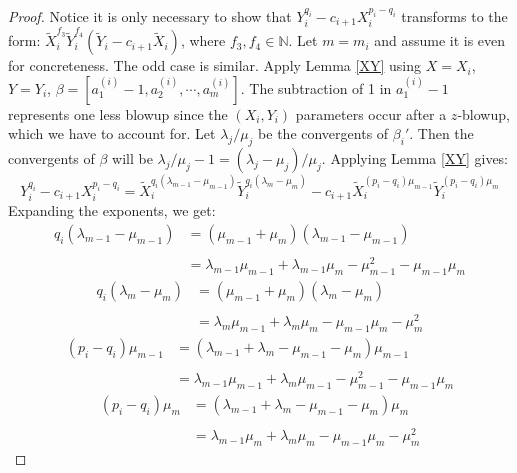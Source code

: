 \documentclass[11pt]{amsart}
\theoremstyle{definition}
\begin{document}
{\begin{proof}
Notice it is only necessary to show that $Y_{i}^{q_i} - c_{i+1}X_{i}^{p_i-q_i}$ transforms to the form: $\tilde X_{i}^{f_3} \tilde Y_{i}^{f_4} \left(\tilde Y_{i}-c_{i+1} \tilde X_{i}\right)$, where $f_3,f_4\in\mathbb{N}$. Let $m=m_i$ and assume it is even for concreteness. The odd case is similar. Apply Lemma \ref{XY} using $X=X_i$, $Y=Y_i$, $\beta=\left[a_1^{(i)}-1,a_2^{(i)},\cdots,a_{m}^{(i)}\right]$. The subtraction of 1 in $a_1^{(i)}-1$ represents one less blowup since the $(X_i,Y_i)$ parameters occur after a $z$-blowup, which we have to account for. Let $\lambda_j/\mu_j$ be the convergents of $\beta_i'$. Then the convergents of $\beta$ will be $\lambda_j/\mu_j-1=(\lambda_j-\mu_j)/\mu_j$. Applying Lemma \ref{XY} gives:
\begin{equation*}
Y_{i}^{q_i} - c_{i+1}X_{i}^{p_i-q_i} = \tilde X_i^{q_i(\lambda_{m-1}-\mu_{m-1})} \tilde Y_i^{q_i(\lambda_m-\mu_m)} - c_{i+1} \tilde X_i^{(p_i-q_i)\mu_{m-1}} \tilde Y_i^{(p_i-q_i)\mu_m}
\end{equation*}
Expanding the exponents, we get:
\begin{equation*}
\begin{array}{rl}
q_i(\lambda_{m-1}-\mu_{m-1}) & = (\mu_{m-1}+\mu_m)(\lambda_{m-1}-\mu_{m-1})
\\\\
 & =\lambda_{m-1}\mu_{m-1}+\lambda_{m-1}\mu_m-\mu_{m-1}^2-\mu_{m-1}\mu_m
\end{array}
\end{equation*}
\begin{equation*}
\begin{array}{rl}
q_i(\lambda_m-\mu_m) & = (\mu_{m-1}+\mu_m)(\lambda_m-\mu_m)
\\\\
& =\lambda_m\mu_{m-1}+\lambda_m\mu_m-\mu_{m-1}\mu_m-\mu_m^2
\end{array}
\end{equation*}
\begin{equation*}
\begin{array}{rl}
(p_i-q_i)\mu_{m-1} & = (\lambda_{m-1}+\lambda_m-\mu_{m-1}-\mu_m)\mu_{m-1}
\\\\
& =\lambda_{m-1}\mu_{m-1}+\lambda_m\mu_{m-1}-\mu_{m-1}^2-\mu_{m-1}\mu_m
\end{array}
\end{equation*}
\begin{equation*}
\begin{array}{rl}
(p_i-q_i)\mu_m & =(\lambda_{m-1}+\lambda_m-\mu_{m-1}-\mu_m)\mu_m
\\\\
& =\lambda_{m-1}\mu_m+\lambda_m\mu_m-\mu_{m-1}\mu_m-\mu_m^2
\end{array}
\end{equation*}


\end{proof}}
\end{document}
